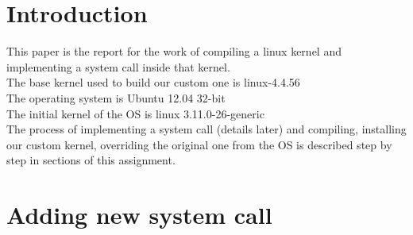\documentclass[a4paper]{article}
\begin{document}

\newpage
\tableofcontents
\newpage
\section{Introduction}
This paper is the report for the work of compiling a linux kernel and implementing a system call inside that kernel.\\
The base kernel used to build our custom one is linux-4.4.56\\
The operating system is Ubuntu 12.04 32-bit\\
The initial kernel of the OS is linux 3.11.0-26-generic\\
The process of implementing a system call (details later) and compiling, installing our custom kernel, overriding the original one from the OS is described step by step in sections of this assignment.
\section{Adding new system call}
\end{document}
